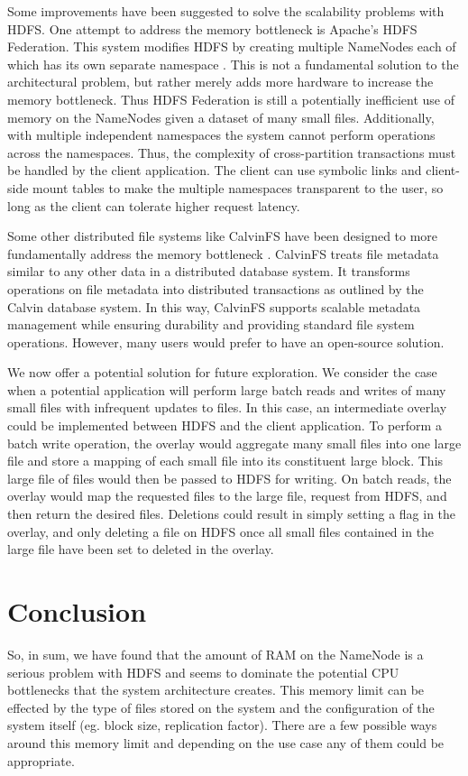 \documentclass[11pt, a4paper]{article}
\begin{document}
\begin{multicols*}{2}
Some improvements have been suggested to solve the scalability problems with HDFS. One attempt to address the memory bottleneck is Apache's HDFS Federation. This system modifies HDFS by creating multiple NameNodes each of which has its own separate namespace \cite{Federation}. This is not a fundamental solution to the architectural problem, but rather merely adds more hardware to increase the memory bottleneck. Thus HDFS Federation is still a potentially inefficient use of memory on the NameNodes given a dataset of many small files. Additionally, with multiple independent namespaces the system cannot perform operations across the namespaces. Thus, the complexity of cross-partition transactions must be handled by the client application. The client can use symbolic links and client-side mount tables to make the multiple namespaces transparent to the user, so long as the client can tolerate higher request latency.

Some other distributed file systems like CalvinFS have been designed to more fundamentally address the memory bottleneck \cite{CalvinFS}. CalvinFS treats file metadata similar to any other data in a distributed database system. It transforms operations on file metadata into distributed transactions as outlined by the Calvin database system. In this way, CalvinFS supports scalable metadata management while ensuring durability and providing standard file system operations. However, many users would prefer to have an open-source solution.

We now offer a potential solution for future exploration. We consider the case when a potential application will perform large batch reads and writes of many small files with infrequent updates to files. In this case, an intermediate overlay could be implemented between HDFS and the client application. To perform a batch write operation, the overlay would aggregate many small files into one large file and store a mapping of each small file into its constituent large block. This large file of files would then be passed to HDFS for writing. On batch reads, the overlay would map the requested files to the large file, request from HDFS, and then return the desired files. Deletions could result in simply setting a flag in the overlay, and only deleting a file on HDFS once all small files contained in the large file have been set to deleted in the overlay.
\section{Conclusion}
So, in sum, we have found that the amount of RAM on the NameNode is a serious problem with HDFS and seems to dominate the potential CPU bottlenecks that the system architecture creates. This memory limit can be effected by the type of files stored on the system and the configuration of the system itself (eg. block size, replication factor). There are a few possible ways around this memory limit and depending on the use case any of them could be appropriate. 



\end{multicols*}
\end{document}
